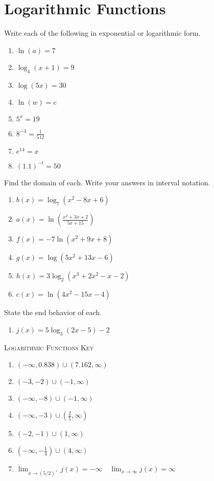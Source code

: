 \chapter{Logarithmic Functions}

Write each of the following in exponential or logarithmic form.
\begin{enumerate}
	\item $\ln(a) = 7$
    \item $\log_4 (x+1) = 9$
    \item $\log (5x) = 30$
    \item $\ln(w) = c$
    \item $5^x = 19$
    \item $8^{-3} = \frac{1}{512}$
    \item $e^{14} = x$
    \item $(1.1)^{-t} = 50$
\end{enumerate}	\setcounter{Review}{\value{enumi}}


Find the domain of each. Write your answers in interval notation.
\begin{enumerate}	\setcounter{enumi}{\value{Review}}
	\item $b(x) = \log_7\left(x^2 - 8x + 6\right)$
	\item $a(x) = \ln\left(\frac{x^2+3x+2}{5x+15}\right)$
	\item $f(x) = -7\ln\left(x^2 + 9x + 8\right)$
	\item $g(x) = \log\left(5x^2 + 13x - 6\right)$
	\item $h(x) = 3\log_2\left(x^3+2x^2-x-2\right)$
	\item $c(x) = \ln\left(4x^2 - 15x - 4\right)$
\end{enumerate}
\setcounter{Review}{\value{enumi}}

State the end behavior of each.
\begin{enumerate}	\setcounter{enumi}{\value{Review}}
	\item $j(x) = 5\log_3\left(2x-5\right) - 2$
\end{enumerate}

\newpage

\textsc{Logarithmic Functions Key}

\begin{enumerate}
	\item $(-\infty, 0.838) \cup (7.162, \infty)$
    \item $(-3, -2) \cup (-1, \infty)$
    \item $(-\infty, -8) \cup (-1, \infty)$
    \item $(-\infty, -3) \cup \left(\frac{2}{5}, \infty\right)$
    \item $(-2, -1) \cup (1, \infty)$
    \item $\left(-\infty, -\frac{1}{4}\right) \cup (4, \infty)$
    \item $\lim_{x \to (5/2)^+} j(x) = -\infty \quad \lim_{x \to \infty} j(x) = \infty$ 
\end{enumerate}
